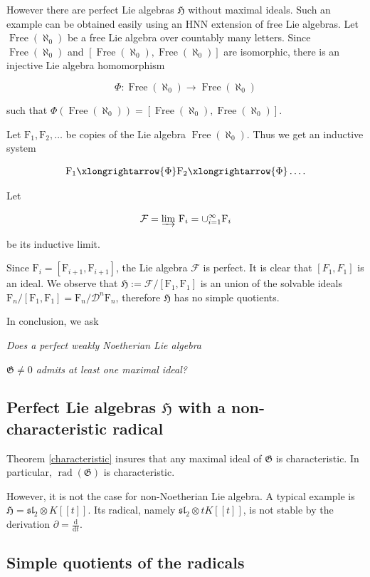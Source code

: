 \documentclass[11pt, letterpaper, reqno]{amsart}
\theoremstyle{definition}
\newcommand{\rad}{\operatorname{rad}}
\newcommand{\cD}{\mathscr D}
\newcommand{\cF}{\mathcal F}
\newcommand{\fsl}{\mathfrak{sl}}
\newcommand{\fH}{\mathfrak{H}}
\newcommand{\fG}{\mathfrak{G}}
\newcommand{\F}{\mathrm{F}}
\newcommand{\Free}{\operatorname{Free}}
\renewcommand{\d}{\mathrm{d}}
\begin{document}
However there are perfect Lie algebras $\fH$ without maximal ideals.
Such an example can be obtained easily using 
an HNN extension of free Lie algebras. Let
$\Free(\aleph_0)$ be a free Lie algebra over countably many letters. Since $\Free(\aleph_0)$ and $[\Free(\aleph_0),\Free(\aleph_0)]$ are isomorphic, there is an injective  Lie algebra homomorphism

$$\Phi: \Free(\aleph_0)\to \Free(\aleph_0)$$

\noindent such that $\Phi(\Free(\aleph_0))=
[\Free(\aleph_0),\Free(\aleph_0)]$. 

Let 
$\F_1, \F_2,\ldots$ be copies of the Lie algebra
$\Free(\aleph_0)$. Thus we get an inductive system

$$\F_1 \xlongrightarrow{\Phi}\F_2
 \xlongrightarrow{\Phi}\ldots.$$

\noindent Let

$$\cF=\varinjlim\,\F_i=\cup_{i=1}^\infty \F_i$$

\noindent be its inductive limit.

Since $\F_i=[\F_{i+1},\F_{i+1}]$, the Lie algebra
$\cF$ is perfect. It is clear that $[F_1,F_1]$ is an ideal. We observe that  $\fH:=\cF/[\F_1,\F_1]$ is an union of the
solvable ideals $\F_n/[\F_1,\F_1]=\F_n/\cD^n \F_n$, therefore
$\fH$ has no simple quotients. 

In conclusion, we  ask

\hskip2cm{\it Does a perfect  weakly Noetherian Lie algebra }

\hskip2cm{\it $\fG\neq 0$ admits at least one maximal ideal?}


\subsection{Perfect Lie algebras $\fH$ with a non-characteristic radical}

Theorem \ref{characteristic} insures that 
any maximal ideal of $\fG$ is characteristic.
In particular, $\rad(\fG)$ is characteristic.

However, it is not the case for non-Noetherian Lie algebra.
A typical example is 
$\fH=\fsl_2\otimes K[[t]]$. Its radical, namely
$\fsl_2\otimes t K[[t]]$,  is not stable by the
derivation $\partial=\frac{\d}{\d t}$.

\subsection{Simple quotients of the radicals}
\end{document}
